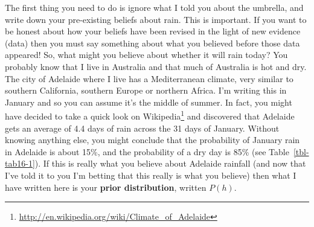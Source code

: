 \documentclass[
  a4paper,
]{book}
\begin{document}
The first thing you need to do is ignore what I told you about the
umbrella, and write down your pre-existing beliefs about rain. This is
important. If you want to be honest about how your beliefs have been
revised in the light of new evidence (data) then you must say something
about what you believed before those data appeared! So, what might you
believe about whether it will rain today? You probably know that I live
in Australia and that much of Australia is hot and dry. The city of
Adelaide where I live has a Mediterranean climate, very similar to
southern California, southern Europe or northern Africa. I'm writing
this in January and so you can assume it's the middle of summer. In
fact, you might have decided to take a quick look on
Wikipedia\footnote{\url{http://en.wikipedia.org/wiki/Climate_of_Adelaide}}
and discovered that Adelaide gets an average of 4.4 days of rain across
the 31 days of January. Without knowing anything else, you might
conclude that the probability of January rain in Adelaide is about 15\%,
and the probability of a dry day is 85\% (see Table~\ref{tbl-tab16-1}).
If this is really what you believe about Adelaide rainfall (and now that
I've told it to you I'm betting that this really is what you believe)
then what I have written here is your \textbf{prior distribution},
written \(P(h)\).

\hypertarget{tbl-tab16-1}{}
 
  \providecommand{\huxb}[2]{\arrayrulecolor[RGB]{#1}\global\arrayrulewidth=#2pt}
  \providecommand{\huxvb}[2]{\color[RGB]{#1}\vrule width #2pt}
  \providecommand{\huxtpad}[1]{\rule{0pt}{#1}}
  \providecommand{\huxbpad}[1]{\rule[-#1]{0pt}{#1}}
\end{document}
